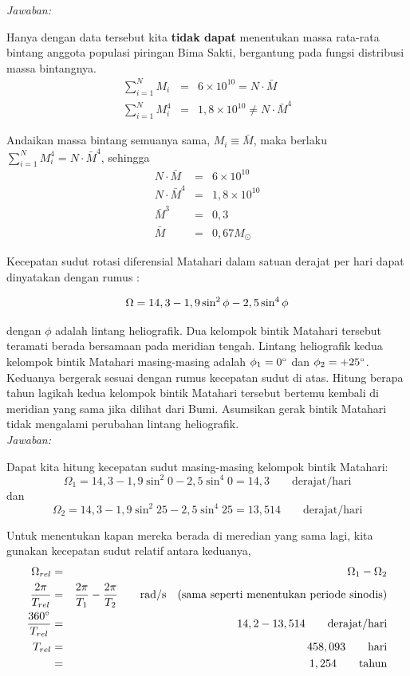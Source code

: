 \documentclass[11pt,fleqn]{exam}
\begin{document}
\begin{questions}
\textit{Jawaban: } 

Hanya dengan data tersebut kita \textbf{tidak dapat} menentukan massa rata-rata bintang anggota populasi piringan Bima Sakti, bergantung pada fungsi distribusi massa bintangnya.
\begin{eqnarray*}
\sum_{i=1}^{N} {M_i} &=& 6\times 10^{10} = N \cdot \bar{M} \\
\sum_{i=1}^{N} {M_i^4} &=& 1,8\times 10^{10} \neq N \cdot \bar{M}^4
\end{eqnarray*}

Andaikan massa bintang semuanya sama, $M_i \equiv \bar{M}$, maka berlaku $\sum_{i=1}^{N} {M_i^4} = N \cdot \bar{M}^4$, sehingga
\begin{eqnarray*}
N \cdot \bar{M} &=& 6\times 10^{10}\\
N \cdot \bar{M}^4 &=& 1,8\times 10^{10}\\
\bar{M}^3 &=& 0,3\\
\bar{M} &=& 0,67 M_{\odot}  
\end{eqnarray*}


\vspace{0.3cm}
\question Kecepatan sudut rotasi diferensial Matahari dalam satuan derajat per hari dapat dinyatakan dengan rumus :

\begin{eqnarray*}
\centering
\Omega = 14,3 - 1,9 \sin^2 \phi - 2,5 \sin^4 \phi
\end{eqnarray*}

dengan $\phi$ adalah lintang heliografik. Dua kelompok bintik Matahari tersebut teramati berada bersamaan pada meridian tengah. Lintang heliografik kedua kelompok bintik Matahari masing-masing adalah $\phi_1=0\degree$ dan $\phi_2=+25\degree$. Keduanya bergerak sesuai dengan rumus kecepatan sudut di atas. Hitung berapa tahun lagikah kedua kelompok bintik Matahari tersebut bertemu kembali di meridian yang sama jika dilihat dari Bumi. Asumsikan gerak bintik Matahari tidak mengalami perubahan lintang heliografik.\\

\textit{Jawaban: } 

Dapat kita hitung kecepatan sudut masing-masing kelompok bintik Matahari:
$$\Omega_1 = 14,3 - 1,9 \sin^2{0} - 2,5 \sin^4{0} = 14,3 \qquad \text{derajat/hari}$$
dan
$$\Omega_2 = 14,3 - 1,9 \sin^2{25} - 2,5 \sin^4{25} = 13,514 \qquad \text{derajat/hari}$$

Untuk menentukan kapan mereka berada di meredian yang sama lagi, kita gunakan kecepatan sudut relatif antara keduanya,
\begin{eqnarray*}
\Omega_{rel} &=& \Omega_1 - \Omega_2\\
\frac{2 \pi}{T_{rel}} &=& \frac{2 \pi}{T_{1}} - \frac{2 \pi}{T_{2}} \qquad \text{rad/s} \quad \text{(sama seperti menentukan periode sinodis)}\\
\frac{360\degree}{T_{rel}} &=& 14,2 - 13,514 \qquad \text{derajat/hari}\\
T_{rel} &=& 458,093 \qquad \text{hari}\\
&=& 1,254 \qquad \text{tahun}
\end{eqnarray*}


\end{questions}
\end{document}
